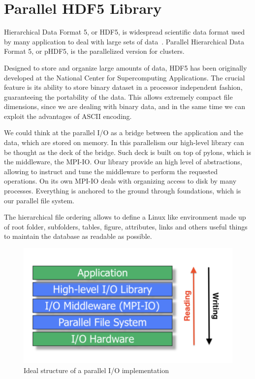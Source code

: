 \section{Parallel HDF5 Library}
Hierarchical Data Format 5, or HDF5, is widespread scientific data format used by many application to deal with large sets of data~\cite{hdf5}. Parallel Hierarchical Data Format 5, or pHDF5, is the parallelized version for clusters.\par
Designed to store and organize large amounts of data, HDF5 has been originally developed at the National Center for Supercomputing Applications. 
The crucial feature is its ability to store binary dataset in a processor independent fashion, guaranteeing the portability of the data. This allows extremely compact file dimensions, since we are dealing with binary data, and in the same time we can exploit the advantages of ASCII encoding.\par
We could think at the parallel I/O as a bridge between the application and the data, which are stored on memory. In this parallelism our high-level library can be thought as the deck of the bridge. Such deck is built on top of pylons, which is the middleware, the MPI-IO. Our library provide an high level of abstractions, allowing to instruct and tune the middleware to perform the requested operations. On its own MPI-IO deals with organizing access to disk by many processes. Everything is anchored to the ground through foundations, which is our parallel file system.\par
The hierarchical file ordering allows to define a Linux like environment made up of root folder, subfolders, tables, figure, attributes, links and others useful things to maintain the database as readable as possible.\par
\begin{figure}
\begin{center}
\includegraphics[scale=0.4]{grafici/parallelio}
\caption{Ideal structure of a parallel I/O implementation}
\label{default}
\end{center}
\end{figure}

